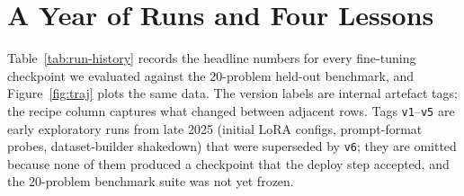 \documentclass[11pt]{article}
\begin{document}
\section{A Year of Runs and Four Lessons}
\label{sec:runs}
\label{sec:lessons}

Table~\ref{tab:run-history} records the headline numbers for every
fine-tuning checkpoint we evaluated against the $20$-problem held-out
benchmark, and Figure~\ref{fig:traj} plots the same data. The version
labels are internal artefact tags; the recipe column captures what
changed between adjacent rows. Tags \texttt{v1}--\texttt{v5} are early
exploratory runs from late 2025 (initial LoRA configs, prompt-format
probes, dataset-builder shakedown) that were superseded by \texttt{v6};
they are omitted because none of them produced a checkpoint that the
deploy step accepted, and the $20$-problem benchmark suite was not yet
frozen.
\end{document}
